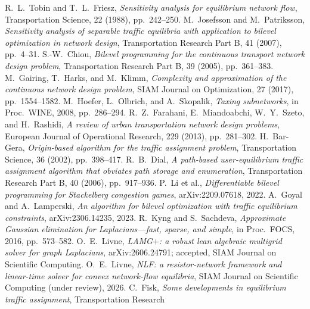 \documentclass[ijoc]{informs3}
\begin{document}
\begin{thebibliography}{}
 R.~L.~Tobin and T.~L.~Friesz, \emph{Sensitivity analysis for equilibrium network flow},
Transportation Science, 22 (1988), pp.~242--250.
 M.~Josefsson and M.~Patriksson, \emph{Sensitivity analysis of separable traffic equilibria with
application to bilevel optimization in network design}, Transportation Research Part B, 41 (2007), pp.~4--31.
 S.-W.~Chiou, \emph{Bilevel programming for the continuous transport network design problem},
Transportation Research Part B, 39 (2005), pp.~361--383.
 M.~Gairing, T.~Harks, and M.~Klimm, \emph{Complexity and approximation of the continuous
network design problem}, SIAM Journal on Optimization, 27 (2017), pp.~1554--1582.
 M.~Hoefer, L.~Olbrich, and A.~Skopalik, \emph{Taxing subnetworks}, in Proc.\ WINE, 2008,
pp.~286--294.
 R.~Z.~Farahani, E.~Miandoabchi, W.~Y.~Szeto, and H.~Rashidi, \emph{A review of urban
transportation network design problems}, European Journal of Operational Research, 229 (2013), pp.~281--302.
 H.~Bar-Gera, \emph{Origin-based algorithm for the traffic assignment problem},
Transportation Science, 36 (2002), pp.~398--417.
 R.~B.~Dial, \emph{A path-based user-equilibrium traffic assignment algorithm that obviates
path storage and enumeration}, Transportation Research Part B, 40 (2006), pp.~917--936.
 P.~Li et al., \emph{Differentiable bilevel programming for Stackelberg congestion games},
arXiv:2209.07618, 2022.
 A.~Goyal and A.~Lamperski, \emph{An algorithm for bilevel optimization with traffic
equilibrium constraints}, arXiv:2306.14235, 2023.
 R.~Kyng and S.~Sachdeva, \emph{Approximate Gaussian elimination for Laplacians---fast,
sparse, and simple}, in Proc.\ FOCS, 2016, pp.~573--582.
 O.~E.~Livne, \emph{LAMG$+$: a robust lean algebraic multigrid solver for graph Laplacians},
arXiv:2606.24791; accepted, SIAM Journal on Scientific Computing.
 O.~E.~Livne, \emph{NLF: a resistor-network framework and linear-time solver for convex network-flow
equilibria}, SIAM Journal on Scientific Computing (under review), 2026.
 C.~Fisk, \emph{Some developments in equilibrium traffic assignment}, Transportation Research

\end{thebibliography}
\end{document}
